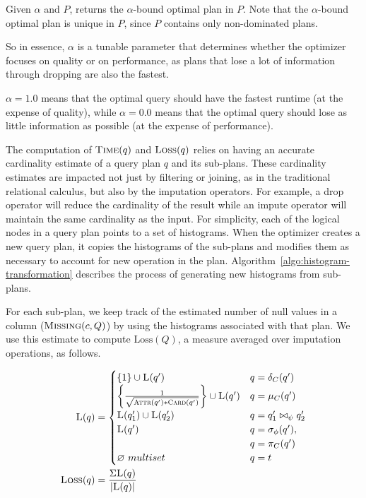 Given $\alpha$ and $P$, \ProjectName{} returns the $\alpha$-bound optimal plan in $P$. Note that the $\alpha$-bound optimal plan is unique in $P$, since $P$ contains only non-dominated plans.

So in essence, $\alpha$ is a tunable parameter that determines whether the optimizer focuses on quality or on performance, as plans that
lose a lot of information through dropping are also the fastest. 

$\alpha = 1.0$ means that the optimal query should have the fastest runtime (at the expense of quality), while $\alpha=0.0$ means that the optimal query should lose
as little information as possible (at the expense of performance).

The computation of $\textsc{Time}(q)$ and $\textsc{Loss}(q)$ relies on having an accurate cardinality estimate of a query plan $q$ and its sub-plans. 
These cardinality estimates are impacted not just by filtering or joining, as in the traditional relational calculus, but also by the imputation operators.
For example, a drop operator will reduce the cardinality of the result while an impute operator will maintain the same cardinality as the input.
For simplicity, each of the logical nodes in a query plan points to a set of histograms.
When the optimizer creates a new query plan, it copies the histograms of the sub-plans and modifies them as necessary to account for new operation in the plan.
Algorithm~\ref{algo:histogram-transformation} describes the process of generating new histograms from sub-plans.

For each sub-plan, we keep track of the estimated number of
null values in a column  ($\textsc{Missing}(c, Q)$) by using the histograms associated with
that plan. We use this estimate to compute $\text{Loss}(Q)$, a measure averaged over imputation operations, as follows.

\begin{align*}
  \textsc{L}(q) &= \begin{cases}
     \{1\} \cup \textsc{L}(q') & q = \delta_C(q') \\
    \left\{\frac{1}{\sqrt{ \textsc{Attr}(q') * \textsc{Card}(q')}}\right\} \cup \textsc{L}(q')  & q = \mu_C(q') \\
    \textsc{L}(q_1') \cup \textsc{L}(q_2') & q = q_1' \bowtie_\psi q_2' \\
    \textsc{L}(q') & q = \sigma_\phi(q'), \\ & q = \pi_C(q') \\
    \emptyset\ multiset & q = t\\
  \end{cases}\\
  \textsc{Loss}(q) &= \frac{\Sigma \textsc{L}(q)}{|\textsc{L}(q)|}
\end{align*}

